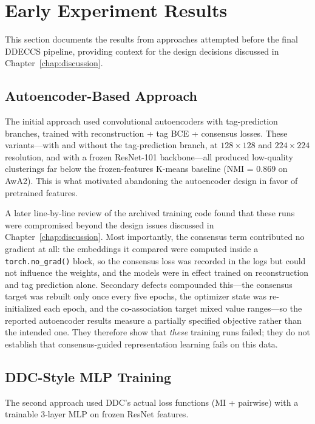 \section{Early Experiment Results}
\label{sec:early_results}

This section documents the results from approaches attempted before the final DDECCS pipeline, providing context for the design decisions discussed in Chapter~\ref{chap:discussion}.

\subsection{Autoencoder-Based Approach}

The initial approach used convolutional autoencoders with tag-prediction branches, trained with reconstruction + tag BCE + consensus losses. These variants---with and without the tag-prediction branch, at $128\times128$ and $224\times224$ resolution, and with a frozen ResNet-101 backbone---all produced low-quality clusterings far below the frozen-features K-means baseline (NMI = 0.869 on AwA2). This is what motivated abandoning the autoencoder design in favor of pretrained features.

A later line-by-line review of the archived training code found that these runs were compromised beyond the design issues discussed in Chapter~\ref{chap:discussion}. Most importantly, the consensus term contributed no gradient at all: the embeddings it compared were computed inside a \texttt{torch.no\_grad()} block, so the consensus loss was recorded in the logs but could not influence the weights, and the models were in effect trained on reconstruction and tag prediction alone. Secondary defects compounded this---the consensus target was rebuilt only once every five epochs, the optimizer state was re-initialized each epoch, and the co-association target mixed value ranges---so the reported autoencoder results measure a partially specified objective rather than the intended one. They therefore show that \emph{these} training runs failed; they do not establish that consensus-guided representation learning fails on this data.

\subsection{DDC-Style MLP Training}
\label{subsec:mlp_training}

The second approach used DDC's actual loss functions (MI + pairwise) with a trainable 3-layer MLP on frozen ResNet features.

